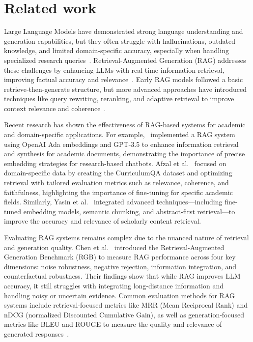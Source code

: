 \documentclass[fleqn,moreauthors,10pt]{ds_report}
\begin{document}
\section*{Related work}


Large Language Models have demonstrated strong language understanding and generation capabilities, but they often struggle with hallucinations, outdated knowledge, and limited domain-specific accuracy, especially when handling specialized research queries~\cite{kandpal2023longtail}. Retrieval-Augmented Generation (RAG) addresses these challenges by enhancing LLMs with real-time information retrieval, improving factual accuracy and relevance~\cite{gao2024rag}. Early RAG models followed a basic retrieve-then-generate structure, but more advanced approaches have introduced techniques like query rewriting, reranking, and adaptive retrieval to improve context relevance and coherence~\cite{gao2024rag}.

Recent research has shown the effectiveness of RAG-based systems for academic and domain-specific applications. For example,~\cite{Chatbots_in_Academia} implemented a RAG system using OpenAI Ada embeddings and GPT-3.5 to enhance information retrieval and synthesis for academic documents, demonstrating the importance of precise embedding strategies for research-based chatbots. Afzal et al.~\cite{afzal2024towards} focused on domain-specific data by creating the CurriculumQA dataset and optimizing retrieval with tailored evaluation metrics such as relevance, coherence, and faithfulness, highlighting the importance of fine-tuning for specific academic fields. Similarly, Yasin et al.~\cite{yasin2024retrieval} integrated advanced techniques—including fine-tuned embedding models, semantic chunking, and abstract-first retrieval—to improve the accuracy and relevance of scholarly content retrieval.

Evaluating RAG systems remains complex due to the nuanced nature of retrieval and generation quality. Chen et al.~\cite{chen2024benchmarking} introduced the Retrieval-Augmented Generation Benchmark (RGB) to measure RAG performance across four key dimensions: noise robustness, negative rejection, information integration, and counterfactual robustness. Their findings show that while RAG improves LLM accuracy, it still struggles with integrating long-distance information and handling noisy or uncertain evidence. Common evaluation methods for RAG systems include retrieval-focused metrics like MRR (Mean Reciprocal Rank) and nDCG (normalized Discounted Cumulative Gain), as well as generation-focused metrics like BLEU and ROUGE to measure the quality and relevance of generated responses~\cite{lewis2020rag}.
\end{document}
